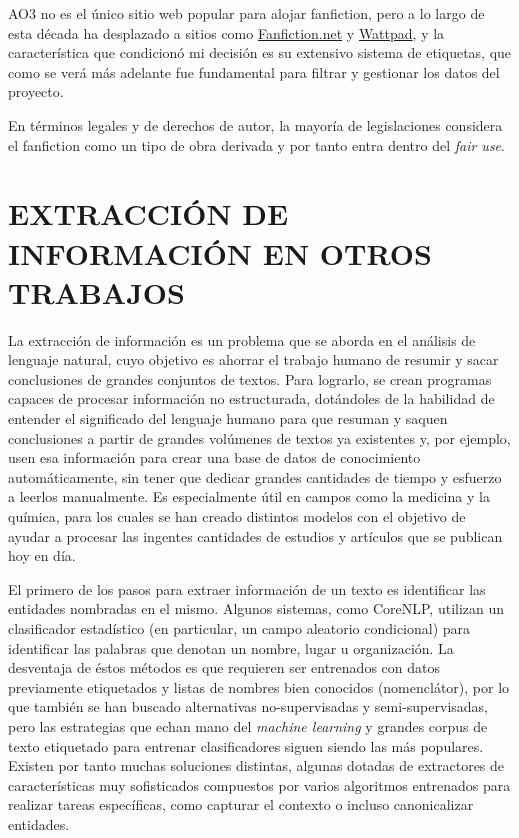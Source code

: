 \documentclass{pre-tfg}
\begin{document}
AO3 no es el único sitio web popular para alojar fanfiction, pero a lo largo de esta década ha desplazado a sitios como \href{http://fanfiction.net}{Fanfiction.net} y \href{https://www.wattpad.com/}{Wattpad}, y la característica que condicionó mi decisión es su extensivo sistema de etiquetas, que como se verá más adelante fue fundamental para filtrar y gestionar los datos del proyecto.

En términos legales y de derechos de autor, la mayoría de legislaciones considera el fanfiction como un tipo de obra derivada \cite{woosh_1998} y por tanto entra dentro del \textit{fair use}.


\cleardoublepage
\section{EXTRACCIÓN DE INFORMACIÓN EN OTROS TRABAJOS}

La extracción de información es un problema que se aborda en el análisis de lenguaje natural, cuyo objetivo es ahorrar el trabajo humano de resumir y sacar conclusiones de grandes conjuntos de textos. Para lograrlo, se crean programas capaces de procesar información no estructurada, dotándoles de la habilidad de entender el significado del lenguaje humano para que resuman y saquen conclusiones a partir de grandes volúmenes de textos ya existentes y, por ejemplo, usen esa información para crear una base de datos de conocimiento automáticamente, sin tener que dedicar grandes cantidades de tiempo y esfuerzo a leerlos manualmente. Es especialmente útil en campos como la medicina y la química, para los cuales se han creado distintos modelos\cite{craven_99}\cite{manica_2019} con el objetivo de ayudar a procesar las ingentes cantidades de estudios y artículos que se publican hoy en día.


El primero de los pasos para extraer información de un texto es identificar las entidades nombradas en el mismo. Algunos sistemas, como CoreNLP\cite{corenlp_ner}, utilizan un clasificador estadístico (en particular, un campo aleatorio condicional\cite{lafferty_2011}) para identificar las palabras que denotan un nombre, lugar u organización. La desventaja de éstos métodos es que requieren ser entrenados con datos previamente etiquetados y listas de nombres bien conocidos (nomenclátor), por lo que también se han buscado alternativas no-supervisadas\cite{nothman_2013} y semi-supervisadas\cite{lin_2009}, pero las estrategias que echan mano del \textit{machine learning} y grandes corpus de texto etiquetado para entrenar clasificadores siguen siendo las más populares. Existen por tanto muchas soluciones distintas, algunas dotadas de extractores de características muy sofisticados compuestos por varios algoritmos entrenados para realizar tareas específicas, como capturar el contexto o incluso canonicalizar entidades\cite{wick_2009}.
\end{document}

